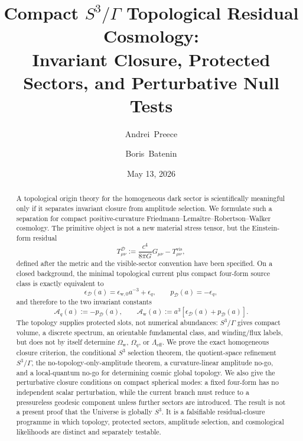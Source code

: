 \documentclass[
  aps,
  prd,
  reprint,
  superscriptaddress,
  floatfix,
  nofootinbib,
  longbibliography
]{revtex4-2}
\theoremstyle{plain}
\theoremstyle{definition}
\theoremstyle{remark}
\newcommand{\D}{\mathcal D}
\newcommand{\vis}{\mathrm{vis}}
\newcommand{\w}{\mathrm w}
\newcommand{\eff}{\mathrm{eff}}
\newcommand{\Ow}{\Omega_{\mathrm w}}
\newcommand{\Oq}{\Omega_q}
\newcommand{\Aq}{\mathcal A_q}
\newcommand{\Aw}{\mathcal A_{\mathrm w}}
\newcommand{\eps}{\epsilon}
\begin{document}
\title{Compact \texorpdfstring{\(S^3/\Gamma\)}{S3/Gamma} Topological Residual Cosmology:\texorpdfstring{\\}{ } 
Invariant Closure, Protected Sectors, and Perturbative Null Tests}

\author{Andrei~Preece}

\author{Boris~Batenin}

\date{May 13, 2026}

\begin{abstract}
A topological origin theory for the homogeneous dark sector is scientifically meaningful only if it separates invariant closure from amplitude selection.  We formulate such a separation for compact positive-curvature Friedmann--Lemaître--Robertson--Walker cosmology.  The primitive object is not a new material stress tensor, but the Einstein-form residual
\[
T^\D_{\mu\nu}:=\frac{c^4}{8\pi G}G_{\mu\nu}-T^{\vis}_{\mu\nu},
\]
defined after the metric and the visible-sector convention have been specified.  On a closed background, the minimal topological current plus compact four-form source class is exactly equivalent to
\[
\eps_\D(a)=\eps_{\w,0}a^{-3}+\eps_q,\qquad p_\D(a)=-\eps_q,
\]
and therefore to the two invariant constants
\[
\Aq(a):=-p_\D(a),\qquad
\Aw(a):=a^3[\eps_\D(a)+p_\D(a)].
\]
The topology supplies protected slots, not numerical abundances: \(S^3/\Gamma\) gives compact volume, a discrete spectrum, an orientable fundamental class, and winding/flux labels, but does not by itself determine \(\Ow\), \(\Oq\), or \(\Lambda_{\eff}\).  We prove the exact homogeneous closure criterion, the conditional \(S^3\) selection theorem, the quotient-space refinement \(S^3/\Gamma\), the no-topology-only-amplitude theorem, a curvature-linear amplitude no-go, and a local-quantum no-go for determining cosmic global topology.  We also give the perturbative closure conditions on compact spherical modes: a fixed four-form has no independent scalar perturbation, while the current branch must reduce to a pressureless geodesic component unless further sectors are introduced.  The result is not a present proof that the Universe is globally \(S^3\).  It is a falsifiable residual-closure programme in which topology, protected sectors, amplitude selection, and cosmological likelihoods are distinct and separately testable.
\end{abstract}

\maketitle
\end{document}
